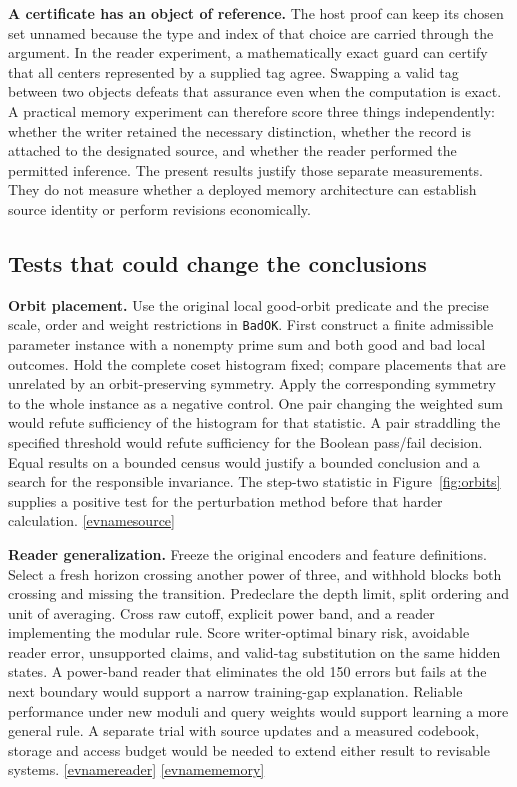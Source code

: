 \documentclass[11pt,letterpaper]{article}
\newcommand{\evref}[1]{\hyperlink{ev-#1}{\textsf{\small[\csname evname#1\endcsname]}}}
\begin{document}
\textbf{A certificate has an object of reference.}
The host proof can keep its chosen set unnamed because the type and index of that choice are carried through the argument. In the reader experiment, a mathematically exact guard can certify that all centers represented by a supplied tag agree. Swapping a valid tag between two objects defeats that assurance even when the computation is exact. A practical memory experiment can therefore score three things independently: whether the writer retained the necessary distinction, whether the record is attached to the designated source, and whether the reader performed the permitted inference. The present results justify those separate measurements. They do not measure whether a deployed memory architecture can establish source identity or perform revisions economically.

\subsection{Tests that could change the conclusions}
\textbf{Orbit placement.} Use the original local good-orbit predicate and the precise scale, order and weight restrictions in \texttt{BadOK}. First construct a finite admissible parameter instance with a nonempty prime sum and both good and bad local outcomes. Hold the complete coset histogram fixed; compare placements that are unrelated by an orbit-preserving symmetry. Apply the corresponding symmetry to the whole instance as a negative control. One pair changing the weighted sum would refute sufficiency of the histogram for that statistic. A pair straddling the specified threshold would refute sufficiency for the Boolean pass/fail decision. Equal results on a bounded census would justify a bounded conclusion and a search for the responsible invariance. The step-two statistic in Figure~\ref{fig:orbits} supplies a positive test for the perturbation method before that harder calculation. \evref{source}

\textbf{Reader generalization.} Freeze the original encoders and feature definitions. Select a fresh horizon crossing another power of three, and withhold blocks both crossing and missing the transition. Predeclare the depth limit, split ordering and unit of averaging. Cross raw cutoff, explicit power band, and a reader implementing the modular rule. Score writer-optimal binary risk, avoidable reader error, unsupported claims, and valid-tag substitution on the same hidden states. A power-band reader that eliminates the old 150 errors but fails at the next boundary would support a narrow training-gap explanation. Reliable performance under new moduli and query weights would support learning a more general rule. A separate trial with source updates and a measured codebook, storage and access budget would be needed to extend either result to revisable systems. \evref{reader} \evref{memory}
\end{document}
